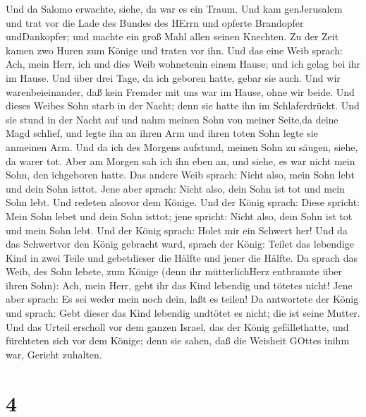  Und da Salomo erwachte, siehe, da war es ein Traum. Und
kam genJerusalem und trat vor die Lade des Bundes des HErrn und opferte
Brandopfer undDankopfer; und machte ein groß Mahl allen seinen Knechten.
 Zu der Zeit kamen zwo Huren zum Könige und traten vor ihn.
 Und das eine Weib sprach: Ach, mein Herr, ich und dies
Weib wohnetenin einem Hause; und ich gelag bei ihr im Hause.
 Und über drei Tage, da ich geboren hatte, gebar sie auch.
Und wir warenbeieinander, daß kein Fremder mit uns war im Hause, ohne
wir beide.  Und dieses Weibes Sohn starb in der Nacht; denn
sie hatte ihn im Schlaferdrückt.  Und sie stund in der
Nacht auf und nahm meinen Sohn von meiner Seite,da deine Magd schlief,
und legte ihn an ihren Arm und ihren toten Sohn legte sie anmeinen Arm.
 Und da ich des Morgens aufstund, meinen Sohn zu säugen,
siehe, da warer tot. Aber am Morgen sah ich ihn eben an, und siehe, es
war nicht mein Sohn, den ichgeboren hatte.  Das andere Weib
sprach: Nicht also, mein Sohn lebt und dein Sohn isttot. Jene aber
sprach: Nicht also, dein Sohn ist tot und mein Sohn lebt. Und redeten
alsovor dem Könige.  Und der König sprach: Diese spricht:
Mein Sohn lebet und dein Sohn isttot; jene spricht: Nicht also, dein
Sohn ist tot und mein Sohn lebt.  Und der König sprach:
Holet mir ein Schwert her! Und da das Schwertvor den König gebracht
ward,  sprach der König: Teilet das lebendige Kind in zwei
Teile und gebetdieser die Hälfte und jener die Hälfte.  Da
sprach das Weib, des Sohn lebete, zum Könige (denn ihr mütterlichHerz
entbrannte über ihren Sohn): Ach, mein Herr, gebt ihr das Kind lebendig
und tötetes nicht! Jene aber sprach: Es sei weder mein noch dein, laßt
es teilen!  Da antwortete der König und sprach: Gebt dieser
das Kind lebendig undtötet es nicht; die ist seine Mutter. 
Und das Urteil erscholl vor dem ganzen Israel, das der König
gefällethatte, und fürchteten sich vor dem Könige; denn sie sahen, daß
die Weisheit GOttes inihm war, Gericht zuhalten.

\hypertarget{section-3}{%
\section{4}\label{section-3}}

